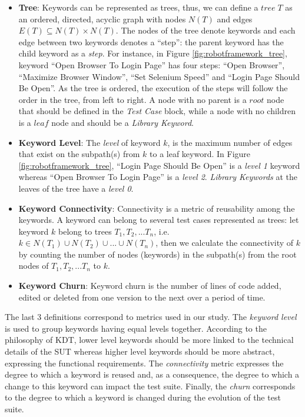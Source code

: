 \begin{itemize}
    \item \textbf{Tree}: Keywords can be represented as trees, thus, we can define a $tree\; T$ as an ordered, directed, acyclic graph with nodes $N(T)$ and edges $E(T) \subseteq N(T) \times N(T)$. The nodes of the tree denote keywords and each edge between two keywords denotes a ``step'': the parent keyword has the child keyword as a \emph{step}. For instance, in Figure \ref{fig:robotframework_tree}, keyword ``Open Browser To Login Page'' has four steps: ``Open Browser'', ``Maximize Browser Window'', ``Set Selenium Speed'' and ``Login Page Should Be Open''. As the tree is ordered, the execution of the steps will follow the order in the tree, from left to right. A node with no parent is a $root$ node that should be defined in the \emph{Test Case} block,  while a node with no children is a $leaf$ node and should be a \emph{Library Keyword}.

    \item \textbf{Keyword Level}: The \emph{level} of keyword $k$, is the maximum number of edges that exist on the subpath(s) from $k$ to a leaf keyword. In Figure \ref{fig:robotframework_tree}, ``Login Page Should Be Open'' is a \emph{level 1} keyword whereas ``Open Browser To Login Page'' is a \emph{level 2}. \emph{Library Keywords} at the leaves of the tree have a \emph{level 0}.

    \item \textbf{Keyword Connectivity}: Connectivity is a metric of reusability among the keywords. A keyword can belong to several test cases represented as trees: let keyword $k$ belong to trees $T_1, T_2, ... T_n$, i.e. $k \in N(T_1) \cup N(T_2) \cup ... \cup N(T_n)$, then we calculate the connectivity of $k$ by counting the number of nodes (keywords) in the subpath(s) from the root nodes of $T_1, T_2, ... T_n$ to $k$.

    \item \textbf{Keyword Churn}: Keyword churn is the number of lines of code added, edited or deleted from one version to the next over a period of time.
\end{itemize}

The last 3 definitions correspond to metrics used in our study. The \emph{keyword level} is used to group keywords having equal levels together. According to the philosophy of KDT, lower level keywords should be more linked to the technical details of the SUT whereas higher level keywords should be more abstract, expressing the functional requirements. The \emph{ connectivity} metric expresses the degree to which a keyword is reused and, as a consequence, the degree to which a change to this keyword can impact the test suite. Finally, the \emph{churn} corresponds to the degree to which a keyword is changed during the evolution of the test suite.

